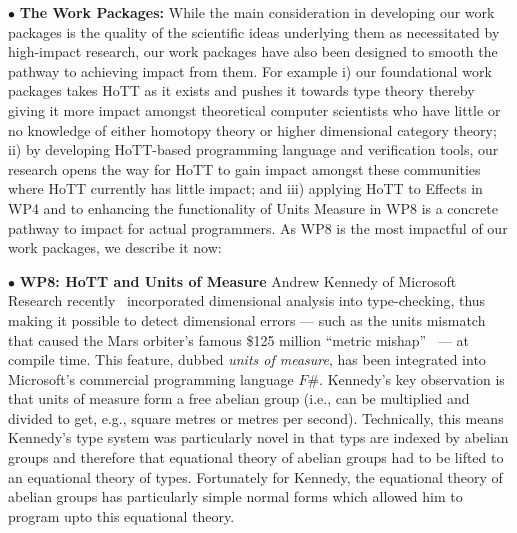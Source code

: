 \documentclass[a4paper,11pt]{article}
\begin{document}
\vspace*{0.02in}

$\bullet$ {\bf The Work Packages:} While the main consideration in
developing our work packages is the quality of the scientific ideas
underlying them as necessitated by high-impact research, our work
packages have also been designed to smooth the pathway to achieving
impact from them. For example i) our foundational work packages takes
HoTT as it exists and pushes it towards type theory thereby giving it 
more impact amongst  theoretical computer scientists who have little or
no knowledge of either homotopy theory or higher dimensional category
theory; ii) by developing HoTT-based programming language and
verification tools, our research opens the way for HoTT to gain impact
amongst these communities where HoTT currently has little impact; and 
iii) applying HoTT to Effects in WP4 and to enhancing the functionality of Units Measure
in WP8 is a concrete pathway to impact for actual programmers. As WP8 is the most
impactful of our work packages, we describe it now:

\vspace*{0.02in}

$\bullet$ {\bf WP8: HoTT and Units of Measure} Andrew Kennedy of
Microsoft Research recently~\cite{aknn97} incorporated dimensional
analysis into type-checking, thus making it possible to detect
dimensional errors --- such as the units mismatch that caused the Mars
orbiter's famous \$125 million ``metric mishap''~\cite{wp99} --- at
compile time. This feature, dubbed {\em units of measure}, has been
integrated into Microsoft's commercial programming language $F\#$.
Kennedy's key observation is that units of measure form a free abelian
group (i.e., can be multiplied and divided to get, e.g., square metres
or metres per second). Technically, this means Kennedy's type system
was particularly novel in that typs are indexed by abelian groups and
therefore that equational theory of abelian groups
had to be lifted to an equational theory of types. Fortunately for
Kennedy, the equational theory of abelian groups has particularly
simple normal forms which allowed him to program upto this equational
theory.
\end{document}
